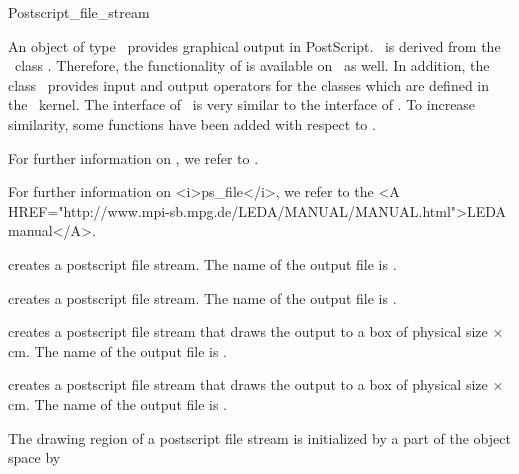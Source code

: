 
\begin{ccRefClass} {Postscript_file_stream}



\ccDefinition 
An object of type \ccRefName\ provides graphical output in PostScript.
\ccRefName\ is derived from the \leda\ class .
Therefore, the functionality of  is available on \ccRefName\ as well.
In addition, the class \ccRefName\ provides input and output 
operators for the classes which are defined in the \cgal\ kernel.
The interface of \ccRefName\ is very similar to the interface of . 
To increase similarity, some functions have been added with respect to .
\begin{ccTexOnly}
For further information on , we refer to \cite{mnsu-lum}.
\end{ccTexOnly}
\begin{ccHtmlOnly}
For further information on <i>ps_file</i>, we refer to the 
<A HREF="http://www.mpi-sb.mpg.de/LEDA/MANUAL/MANUAL.html">LEDA manual</A>.
\end{ccHtmlOnly}


\ccCreation

{creates a postscript file stream. The name of the output file is
 .}

{creates a postscript file stream. The name of the output file is
 .}

{creates a postscript file stream that draws the output to a box
of physical size  $\times$  cm.
The name of the output file is  .}

{creates a postscript file stream that draws the output to a box
of physical size  $\times$  cm.
The name of the output file is  .}


\ccOperations
The drawing region of a postscript file stream is initialized by a part of the 
object space by


\end{ccRefClass}
